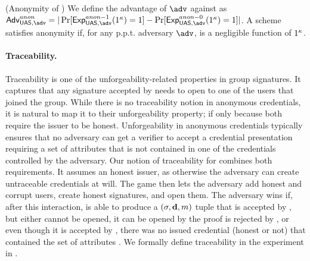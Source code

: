 \begin{definition}{(Anonymity of \GSAC)}
  We define the advantage \AdvAnon of $\adv$ against \ExpAnonb as
  $\AdvAnon=|\Pr\lbrack\ExpAnono(1^\secpar)=1\rbrack-
  \Pr\lbrack\ExpAnonz(1^\secpar)=1\rbrack|$.
  A \GSAC scheme satisfies anonymity if, for any p.p.t. adversary $\adv$,
  \AdvAnon is a negligible function of $1^\kappa$.
\end{definition}

\paragraph{Traceability.} %
Traceability is one of the unforgeability-related properties in group
signatures. It captures that any signature accepted by \Verify needs to open
to one of the users that joined the group. While there is no traceability notion
in anonymous credentials, it is natural to map it to their unforgeability
property; if only because both require the issuer to be honest. Unforgeability
in anonymous credentials typically ensures that no adversary can get a verifier
to accept a credential presentation requiring a set of attributes that is not
contained in one of the credentials controlled by the adversary.
%
Our notion of traceability for \GSAC combines both requirements. It assumes an
honest issuer, as otherwise the adversary can create untraceable credentials at
will. The game then lets the adversary add honest and corrupt users, create
honest signatures, and open them. The adversary wins if, after this interaction,
is able to produce a $(\sigma,\mathbf{d},m)$ tuple that is accepted by \Verify,
but either cannot be opened, it can be opened by the proof is rejected by
\Judge, or even though it is accepted by \Judge, there was no issued credential
(honest or not) that contained the set of attributes \dattrs. We formally
define traceability in the \ExpTrace experiment in .

